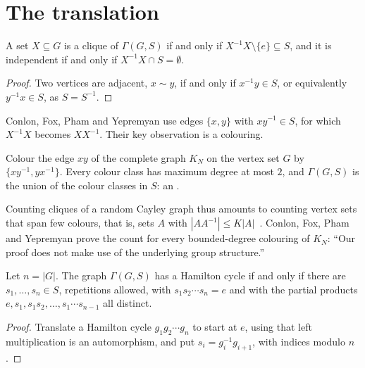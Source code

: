 \section{The translation}\label{sec:translation}


\begin{proposition}\label{prop:clique}
A set $X\subseteq G$ is a clique of $\Gamma(G,S)$ if and only if $X^{-1}X\setminus\{e\}\subseteq S$, and it is independent if and only if $X^{-1}X\cap S=\emptyset$.
\end{proposition}

\begin{proof}
Two vertices are adjacent, $x\sim y$, if and only if $x^{-1}y\in S$, or equivalently $y^{-1}x\in S$, as $S=S^{-1}$.
\end{proof}

Conlon, Fox, Pham and Yepremyan use edges $\{x,y\}$ with $xy^{-1}\in S$, for which $X^{-1}X$ becomes $XX^{-1}$. Their key observation is a colouring.

\begin{fact}\label{fact:entangled}
Colour the edge $xy$ of the complete graph $K_N$ on the vertex set $G$ by $\{xy^{-1},yx^{-1}\}$. Every colour class has maximum degree at most $2$, and $\Gamma(G,S)$ is the union of the colour classes in $S$: an .
\end{fact}

Counting cliques of a random Cayley graph thus amounts to counting vertex sets that span few colours, that is, sets $A$ with $|AA^{-1}|\leq K|A|$~\cite[\S1.1]{cfpy24}. Conlon, Fox, Pham and Yepremyan prove the count for every bounded-degree colouring of $K_N$: ``Our proof does not make use of the underlying group structure.''


\begin{proposition}\label{prop:ham}
Let $n=|G|$. The graph $\Gamma(G,S)$ has a Hamilton cycle if and only if there are $s_1,\dots,s_n\in S$, repetitions allowed, with $s_1s_2\cdots s_n=e$ and with the partial products $e,s_1,s_1s_2,\dots,s_1\cdots s_{n-1}$ all distinct.
\end{proposition}

\begin{proof}
Translate a Hamilton cycle $g_1g_2\cdots g_n$ to start at $e$, using that left multiplication is an automorphism, and put $s_i=g_i^{-1}g_{i+1}$, with indices modulo $n$.
\end{proof}

